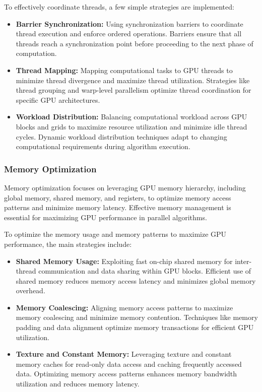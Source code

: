 \documentclass[11pt]{report}
\begin{document}
        To effectively coordinate threads, a few simple strategies are implemented:
        \begin{itemize}
            \item \textbf{Barrier Synchronization:} Using synchronization barriers to coordinate thread execution and enforce ordered operations. Barriers ensure that all threads reach a synchronization point before proceeding to the next phase of computation.

            \item \textbf{Thread Mapping:} Mapping computational tasks to GPU threads to minimize thread divergence and maximize thread utilization. Strategies like thread grouping and warp-level parallelism optimize thread coordination for specific GPU architectures.
        
            \item \textbf{Workload Distribution:} Balancing computational workload across GPU blocks and grids to maximize resource utilization and minimize idle thread cycles. Dynamic workload distribution techniques adapt to changing computational requirements during algorithm execution.
        \end{itemize}
        
        \subsubsection{Memory Optimization}
        Memory optimization focuses on leveraging GPU memory hierarchy, including global memory, shared memory, and registers, to optimize memory access patterns and minimize memory latency. Effective memory management is essential for maximizing GPU performance in parallel algorithms.

        To optimize the memory usage and memory patterns to maximize GPU performance, the main strategies include:

        \begin{itemize}
            \item \textbf{Shared Memory Usage:} Exploiting fast on-chip shared memory for inter-thread communication and data sharing within GPU blocks. Efficient use of shared memory reduces memory access latency and minimizes global memory overhead.
        
            \item \textbf{Memory Coalescing:} Aligning memory access patterns to maximize memory coalescing and minimize memory contention. Techniques like memory padding and data alignment optimize memory transactions for efficient GPU utilization.
        
            \item \textbf{Texture and Constant Memory:} Leveraging texture and constant memory caches for read-only data access and caching frequently accessed data. Optimizing memory access patterns enhances memory bandwidth utilization and reduces memory latency.
        \end{itemize}
        
\end{document}

